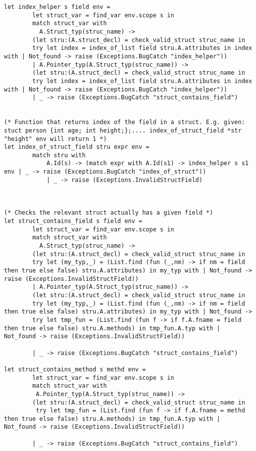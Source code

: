 \documentclass{article}
\begin{document}
\begin{lstlisting}
let index_helper s field env = 
		let struct_var = find_var env.scope s in 
		match struct_var with 
		  A.Struct_typ(struc_name) ->
		(let stru:(A.struct_decl) = check_valid_struct struc_name in 
		try let index = index_of_list field stru.A.attributes in index with | Not_found -> raise (Exceptions.BugCatch "index_helper"))
		| A.Pointer_typ(A.Struct_typ(struc_name)) ->
		(let stru:(A.struct_decl) = check_valid_struct struc_name in 
		try let index = index_of_list field stru.A.attributes in index with | Not_found -> raise (Exceptions.BugCatch "index_helper"))
		| _ -> raise (Exceptions.BugCatch "struct_contains_field")


(* Function that returns index of the field in a struct. E.g. given: stuct person {int age; int height;};.... index_of_struct_field *str "height" env will return 1 *)
let index_of_struct_field stru expr env = 	
		match stru with
	  		A.Id(s) -> (match expr with A.Id(s1) -> index_helper s s1 env | _ -> raise (Exceptions.BugCatch "index_of_struct")) 
			| _ -> raise (Exceptions.InvalidStructField)



(* Checks the relevant struct actually has a given field *)
let struct_contains_field s field env = 
		let struct_var = find_var env.scope s in 
		match struct_var with 
		  A.Struct_typ(struc_name) ->
		(let stru:(A.struct_decl) = check_valid_struct struc_name in 
		try let (my_typ,_) = (List.find (fun (_,nm) -> if nm = field then true else false) stru.A.attributes) in my_typ with | Not_found -> raise (Exceptions.InvalidStructField))
		| A.Pointer_typ(A.Struct_typ(struc_name)) ->
		(let stru:(A.struct_decl) = check_valid_struct struc_name in 
		try let (my_typ,_) = (List.find (fun (_,nm) -> if nm = field then true else false) stru.A.attributes) in my_typ with | Not_found -> 
		try let tmp_fun = (List.find (fun f -> if f.A.fname = field then true else false) stru.A.methods) in tmp_fun.A.typ with | Not_found -> raise (Exceptions.InvalidStructField))

		| _ -> raise (Exceptions.BugCatch "struct_contains_field")

let struct_contains_method s methd env =
		let struct_var = find_var env.scope s in 
		match struct_var with 
		 A.Pointer_typ(A.Struct_typ(struc_name)) ->
		(let stru:(A.struct_decl) = check_valid_struct struc_name in 
		 try let tmp_fun = (List.find (fun f -> if f.A.fname = methd then true else false) stru.A.methods) in tmp_fun.A.typ with | Not_found -> raise (Exceptions.InvalidStructField))

		| _ -> raise (Exceptions.BugCatch "struct_contains_field")



\end{lstlisting}
\end{document}
